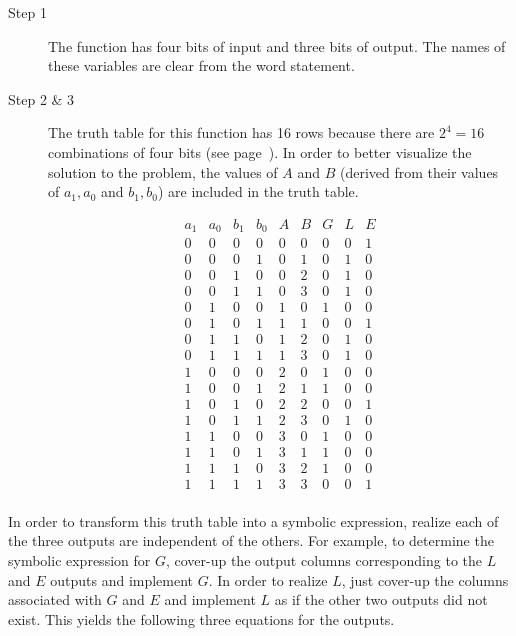 \begin{description}
\item [Step 1] The function has four bits of input and three bits of output.
The names of these variables are clear from the word statement.

\item[Step 2 \& 3]  The truth table for this function has 16 rows
because there are $2^4=16$ combinations of four bits
(see page~\pageref{page:two-to-N}).
In order to better visualize the solution to the problem, the values of $A$ and
$B$ (derived from their values of $a_1,a_0$ and $b_1,b_0$) are included
in the truth table.

$$
\begin{array}{c|c|c|c||c|c||c|c|c}
a_1 & a_0 & b_1 & b_0 & A & B & G & L & E \\ \hline
0 & 0 & 0 & 0 & 0 & 0 & 0 & 0 & 1  \\ \hline
0 & 0 & 0 & 1 & 0 & 1 & 0 & 1 & 0  \\ \hline
0 & 0 & 1 & 0 & 0 & 2 & 0 & 1 & 0  \\ \hline
0 & 0 & 1 & 1 & 0 & 3 & 0 & 1 & 0  \\ \hline
0 & 1 & 0 & 0 & 1 & 0 & 1 & 0 & 0  \\ \hline
0 & 1 & 0 & 1 & 1 & 1 & 0 & 0 & 1  \\ \hline
0 & 1 & 1 & 0 & 1 & 2 & 0 & 1 & 0  \\ \hline
0 & 1 & 1 & 1 & 1 & 3 & 0 & 1 & 0  \\ \hline
1 & 0 & 0 & 0 & 2 & 0 & 1 & 0 & 0  \\ \hline
1 & 0 & 0 & 1 & 2 & 1 & 1 & 0 & 0  \\ \hline
1 & 0 & 1 & 0 & 2 & 2 & 0 & 0 & 1  \\ \hline
1 & 0 & 1 & 1 & 2 & 3 & 0 & 1 & 0  \\ \hline
1 & 1 & 0 & 0 & 3 & 0 & 1 & 0 & 0  \\ \hline
1 & 1 & 0 & 1 & 3 & 1 & 1 & 0 & 0  \\ \hline
1 & 1 & 1 & 0 & 3 & 2 & 1 & 0 & 0  \\ \hline
1 & 1 & 1 & 1 & 3 & 3 & 0 & 0 & 1  \\
\end{array}$$
\end{description}

In order to transform this truth table into a symbolic expression,
realize each of the three outputs are independent of the
others.  For example, to determine the symbolic expression for $G$,
cover-up the output columns corresponding to the $L$ and $E$ outputs
and implement $G$.  In order to realize $L$, just cover-up the
columns associated with $G$ and $E$ and implement $L$ as if
the other two outputs did not exist.  This yields the following
three equations for the outputs.

